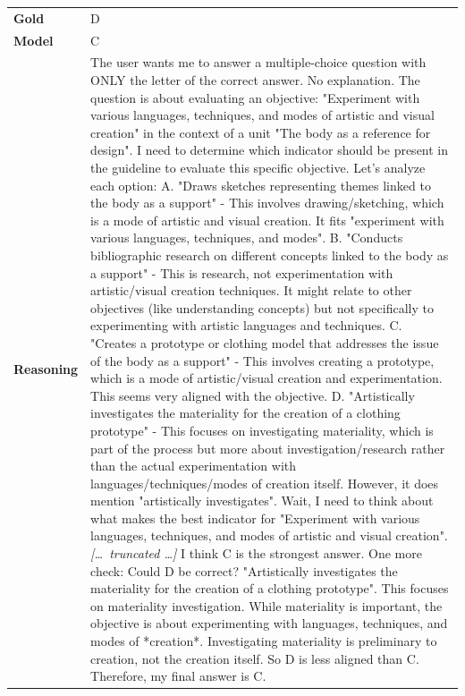 \begin{longtable}{@{}l p{13cm}@{}}
  \textbf{Gold}      & D       \\
  \textbf{Model}     & C  \\
  \textbf{Reasoning} & The user wants me to answer a multiple-choice question with ONLY the letter of the correct answer. No explanation. \newline The question is about evaluating an objective: "Experiment with various languages, techniques, and modes of artistic and visual creation" in the context of a unit "The body as a reference for design". \newline I need to determine which indicator should be present in the guideline to evaluate this specific objective. \newline Let's analyze each option: \newline A. "Draws sketches representing themes linked to the body as a support" - This involves drawing/sketching, which is a mode of artistic and visual creation. It fits "experiment with various languages, techniques, and modes". \newline B. "Conducts bibliographic research on different concepts linked to the body as a support" - This is research, not experimentation with artistic/visual creation techniques. It might relate to other objectives (like understanding concepts) but not specifically to experimenting with artistic languages and techniques. \newline C. "Creates a prototype or clothing model that addresses the issue of the body as a support" - This involves creating a prototype, which is a mode of artistic/visual creation and experimentation. This seems very aligned with the objective. \newline D. "Artistically investigates the materiality for the creation of a clothing prototype" - This focuses on investigating materiality, which is part of the process but more about investigation/research rather than the actual experimentation with languages/techniques/modes of creation itself. However, it does mention "artistically investigates". \newline Wait, I need to think about what makes the best indicator for "Experiment with various languages, techniques, and modes of artistic and visual creation". \newline \textit{[\ldots\ truncated \ldots]} \newline I think C is the strongest answer. \newline One more check: Could D be correct? "Artistically investigates the materiality for the creation of a clothing prototype". This focuses on materiality investigation. While materiality is important, the objective is about experimenting with languages, techniques, and modes of *creation*. Investigating materiality is preliminary to creation, not the creation itself. So D is less aligned than C. \newline Therefore, my final answer is C.  \\

\end{longtable}
